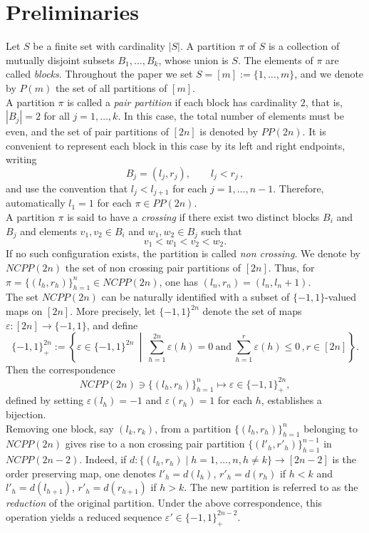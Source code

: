 \documentclass[12pt]{amsart}
\numberwithin{equation}{section}
\theoremstyle{definition}
\begin{document}
\section{Preliminaries}

Let $S$ be a finite set with cardinality $|S|$. A partition $\pi$ of $S$ is a collection of mutually disjoint subsets $B_1,\ldots,B_k$, whose union is $S$. The elements of $\pi$ are called \emph{blocks}. Throughout the paper we set $S=[m]:=\{1,\ldots,m\}$, and we denote by $P(m)$ the set of all partitions of $[m]$.\\
A partition $\pi$ is called a \emph{pair partition} if each block has cardinality $2$, that is, $|B_j|=2$ for all $j=1,\ldots,k$. In this case, the total number of elements must be even, and the set of pair partitions of $[2n]$ is denoted by $PP(2n)$. It is convenient to represent each block in this case by its left and right endpoints, writing
\[
B_j=(l_j,r_j), \qquad l_j<r_j\,,
\]
and use the convention that $l_j<l_{j+1}$ for each $j=1,\ldots, n-1$. Therefore, automatically $l_1=1$ for each $\pi\in PP(2n)$.\\
A partition $\pi$ is said to have a \emph{crossing} if there exist two distinct blocks $B_i$ and $B_j$ and elements $v_1,v_2\in B_i$ and $w_1,w_2\in B_j$ such that
\[
v_1 < w_1 < v_2 < w_2.
\]
If no such configuration exists, the partition is called \emph{non crossing}. We denote by $NCPP(2n)$ the set of non crossing pair partitions of $[2n]$. Thus, for $\pi=\{(l_h,r_h)\}_{h=1}^{n}\in NCPP(2n)$, one has $(l_n,r_n)=(l_n,l_n+1)$. \\
The set $NCPP(2n)$ can be naturally identified with a subset of $\{-1,1\}$-valued maps on $[2n]$. More precisely, let $\{-1,1\}^{2n}$ denote the set of maps $\varepsilon:[2n]\to\{-1,1\}$, and define
\[
\{-1,1\}^{2n}_+ :=
\left\{
\varepsilon\in\{-1,1\}^{2n}\ \middle|\
\sum_{h=1}^{2n}\varepsilon(h)=0
\ \text{and}\
\sum_{h=1}^{r}\varepsilon(h)\le 0\,, r\in[2n]
\right\}.
\]
Then the correspondence
\[
NCPP(2n)\ni\{(l_h,r_h)\}_{h=1}^n \mapsto \varepsilon\in\{-1,1\}^{2n}_+,
\]
defined by setting $\varepsilon(l_h)=-1$ and $\varepsilon(r_h)=1$ for each $h$, establishes a bijection.\\
Removing one block, say $(l_k,r_k)$, from a partition $\{(l_h,r_h)\}_{h=1}^n$ belonging to $NCPP(2n)$ gives rise to a non crossing pair partition $\{(l'_h,r'_h)\}_{h=1}^{n-1}$ in $NCPP(2n-2)$. Indeed, if $d:\{(l_h,r_h)\mid h=1,\ldots, n, h\neq k\}\rightarrow [2n-2]$ is the order preserving map, one denotes $l'_h=d(l_h)$, $r'_h=d(r_h)$ if $h<k$ and $l'_h=d(l_{h+1})$, $r'_h=d(r_{h+1})$ if $h>k$. The new partition is referred to as the \emph{reduction} of the original partition. Under the above correspondence, this operation yields a reduced sequence $\varepsilon'\in\{-1,1\}^{2n-2}_+$.
\end{document}
